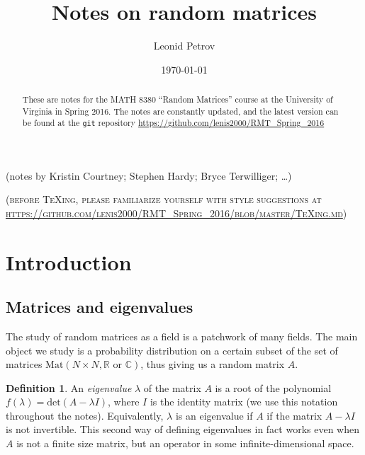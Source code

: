 \documentclass[letterpaper,11pt,oneside,reqno]{amsart}
\numberwithin{equation}{section}
\newcommand{\note}[1]{\textsc{\color{blue}(#1)}}
\newcounter{lecture}
\newcommand{\lect}[1]{\bigskip\addtocounter{lecture}{1}\noindent{\Large{\color{red}\bf{}Lecture \#\arabic{lecture} on #1 \hrulefill}}}
\theoremstyle{definition}
\newtheorem{definition}[proposition]{Definition}
\begin{document}
\title[Notes on random matrices]{Notes on random matrices}

\author[L. Petrov]{Leonid Petrov}
\date{\today}
\maketitle

\begin{center}
	(notes by 
	Kristin Courtney;
	Stephen Hardy;
	Bryce Terwilliger; \ldots)
\end{center}

\begin{abstract}
	These are notes for the MATH 8380 ``Random Matrices'' course at the
	University of Virginia in Spring 2016. The notes are constantly updated,
	and the latest version can be found at the \texttt{git} repository
	\url{https://github.com/lenis2000/RMT_Spring_2016}
\end{abstract}

\bigskip

\begin{center}
\noindent\note{before \TeX{}ing, please familiarize yourself with style suggestions at\\
\url{https://github.com/lenis2000/RMT_Spring_2016/blob/master/TeXing.md}}
\end{center}
\bigskip

\setcounter{tocdepth}{1}
\tableofcontents
\setcounter{tocdepth}{3}

\lect{1/20/2016}

\section{Introduction} %
\label{sec:introduction}

\subsection{Matrices and eigenvalues} %
\label{sub:object_of_study}

The study of random matrices as a field is a patchwork of many fields.  The
main object we study is a probability distribution on a certain subset of the
set of matrices $\mathrm{Mat}(N\times N,\mathbb R \text{ or } \mathbb C)$,
thus giving us a random matrix $A$.

\begin{definition}
An {\it eigenvalue} $\lambda$ of the matrix $A$ is a root of the polynomial
$f(\lambda)=\text{det}(A-\lambda I)$, where $I$ is the identity matrix 
(we use this notation throughout the notes).  
Equivalently, $\lambda$ is an
eigenvalue if $A$ if the matrix $A-\lambda I$ is not invertible. This second
way of defining eigenvalues in fact works even when $A$ is not a finite
size matrix, but an operator in some infinite-dimensional space.
\end{definition}
\end{document}
